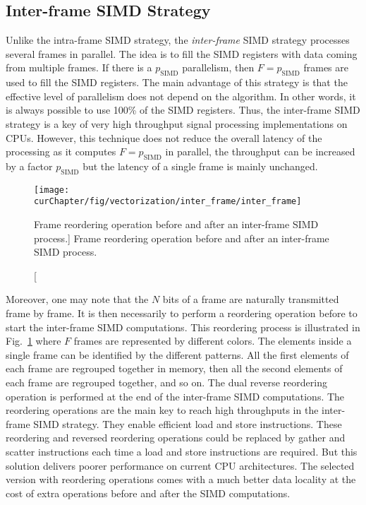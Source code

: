 \subsection{Inter-frame SIMD Strategy}
\label{sec:opt_vec_inter}

Unlike the intra-frame SIMD strategy, the \emph{inter-frame} SIMD strategy
processes several frames in parallel. The idea is to fill the SIMD registers
with data coming from multiple frames. If there is a $p_\text{SIMD}$
parallelism, then $F = p_\text{SIMD}$ frames are used to fill the SIMD
registers. The main advantage of this strategy is that the effective level of
parallelism does not depend on the algorithm. In other words, it is always
possible to use 100\% of the SIMD registers. Thus, the inter-frame SIMD strategy
is a key of very high throughput signal processing implementations on CPUs.
However, this technique does not reduce the overall latency of the processing as
it computes $F = p_\text{SIMD}$ in parallel, the throughput can be increased by
a factor $p_\text{SIMD}$ but the latency of a single frame is mainly unchanged.

\begin{figure}[htp]
  \centering
  \texttt{[image: \\curChapter/fig/vectorization/inter\_frame/inter\_frame]}
  \caption
    [Frame reordering operation before and after an inter-frame SIMD process.]
    {Frame reordering operation before and after an inter-frame SIMD process.}
  \label{fig:opt_vec_inter_frame}
\end{figure}

Moreover, one may note that the $N$ bits of a frame are naturally transmitted
frame by frame. It is then necessarily to perform a reordering operation before
to start the inter-frame SIMD computations. This reordering process is
illustrated in Fig.~\ref{fig:opt_vec_inter_frame} where $F$ frames are
represented by different colors. The elements inside a single frame can be
identified by the different patterns. All the first elements of each frame are
regrouped together in memory, then all the second elements of each frame are
regrouped together, and so on. The dual reverse reordering operation is
performed at the end of the inter-frame SIMD computations. The reordering
operations are the main key to reach high throughputs in the inter-frame SIMD
strategy. They enable efficient load and store instructions. These reordering
and reversed reordering operations could be replaced by gather and scatter
instructions each time a load and store instructions are required. But this
solution delivers poorer performance on current CPU architectures. The selected
version with reordering operations comes with a much better data locality at the
cost of extra operations before and after the SIMD computations.

